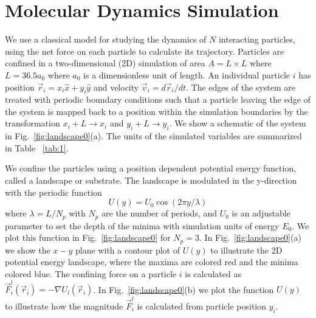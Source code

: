 \documentclass[twocolumn,preprintnumbers,amsmath,amssymb,aps,prx]{revtex4}
\begin{document}

\section{Molecular Dynamics Simulation}
\label{sec:MD}

We use a classical model for 
studying the dynamics of $N$ interacting particles,
using the net force on each particle to calculate
its trajectory.
Particles are confined in a two-dimensional (2D) 
simulation of area $A = L \times L$ where $L=36.5 a_0$
where $a_0$ is a dimensionless unit of length.
An individual particle $i$ has
position $\vec{r}_i = x_i \hat{x} + y_i \hat{y}$
and velocity $\vec{v}_i = d\vec{r}_i/dt$.
The edges of the system are treated with
periodic boundary conditions
such that a particle leaving the edge of the system is mapped
back to a position within the simulation boundaries 
by the transformation $x_i+L \rightarrow x_i$ and $y_i+L \rightarrow y_i$.
We show a schematic of the system in Fig.~\ref{fig:landscape0}(a).
The units of the simulated variables are summarized in Table ~\ref{tab:1}.

We confine the particles using a position dependent 
potential energy function, called a landscape or substrate.
% 
The landscape is modulated in the y-direction
with the periodic function 
 \begin{equation}
   U(y) = U_0 \cos{(2 \pi y / \lambda)}
     \label{eq:ysubstrate}
\end{equation}
 where $\lambda=L/N_p$ with $N_p$ are the number of periods,
 and $U_0$ is an adjustable parameter
 to set the depth of the minima
 with simulation units of energy $E_0$. 
 We plot this function in 
 Fig.~\ref{fig:landscape0}
 for $N_p = 3$. %
 In Fig.~\ref{fig:landscape0}(a) we show 
 the $x-y$ plane with a contour plot of $U(y)$ %
 to illustrate
 the 2D potential energy landscape,
 where 
 the maxima are colored red and the minima colored blue.
 The confining force on a particle $i$
 is calculated as 
 $\vec{F}^{l}_i(\vec{r}_i) = -\nabla U_l(\vec{r}_i)$.
 In Fig.~\ref{fig:landscape0}(b) we plot the function
 $U(y)$ to illustrate how the magnitude
 $\vec{F}^{l}_i$ is calculated from particle position $y_i$.  
 
\end{document}
